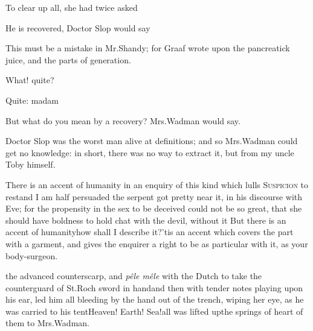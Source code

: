 \documentclass{article}
\begin{document}
To clear up all, she had twice asked

\tsh He is recovered, Doctor Slop would
say\tsh

\bgroup\footnotesize
\indent\fnast\enspace
This must be a mistake in Mr.\@ Shandy; for Graaf wrote upon the pancreatick juice, and the parts of generation.
\par\egroup
\vfill{}\eject

What! quite?

\tsh Quite: madam\tsh

But what do you mean by a recovery? Mrs.\@ Wadman would
say.

Doctor Slop was the worst man alive at definitions; and
so Mrs.\@ Wadman could get no knowledge: in short, there was
no way to extract it, but from my uncle Toby himself.

There is an accent of humanity in an enquiry of this kind which
lulls \textsc{Suspicion} to rest\tsh and I am half
persuaded the serpent got pretty near it, in his discourse with
Eve; for the propensity in the sex to be deceived could not be so
great, that she should have boldness to hold chat with the devil,
without it\tsh{} But there is an accent of
humanity\tsh\break how shall I describe it?\tsk ’tis an
accent which covers the part with a garment, and gives the enquirer
a right to be as particular with it, as your body-surgeon.

\noindent
{}
\break 
{}
the advanced counterscarp, and \textit{pêle mêle}\etp{}
with the Dutch to take the counterguard of St.\@ Roch
sword in hand\tsk and then with tender notes playing upon his
ear, led him all bleeding by the hand out of the trench, wiping her
eye, as he was carried to his tent\tsh Heaven! Earth!
Sea!\tsk all was lifted up\tsk the springs of\break
{}
\break
heart of them to Mrs.\@ Wadman.
\end{document}
